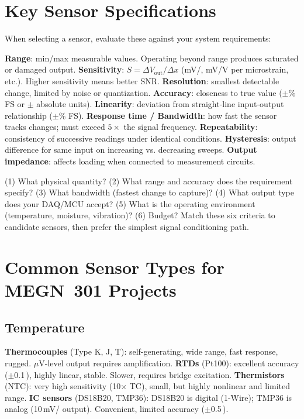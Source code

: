 \section{Key Sensor Specifications}
When selecting a sensor, evaluate these against your system requirements:

\textbf{Range}: min/max measurable values. Operating beyond range produces saturated or damaged output. \textbf{Sensitivity}: $S = \Delta V_{\text{out}}/\Delta x$ (mV/\degC{}, mV/V per microstrain, etc.). Higher sensitivity means better SNR. \textbf{Resolution}: smallest detectable change, limited by noise or quantization. \textbf{Accuracy}: closeness to true value ($\pm$\% FS or $\pm$ absolute units). \textbf{Linearity}: deviation from straight-line input-output relationship ($\pm$\% FS). \textbf{Response time / Bandwidth}: how fast the sensor tracks changes; must exceed $5\times$ the signal frequency. \textbf{Repeatability}: consistency of successive readings under identical conditions. \textbf{Hysteresis}: output difference for same input on increasing vs. decreasing sweeps. \textbf{Output impedance}: affects loading when connected to measurement circuits.

\begin{keyconceptbox}
(1) What physical quantity? (2) What range and accuracy does the requirement specify? (3) What bandwidth (fastest change to capture)? (4) What output type does your DAQ/MCU accept? (5) What is the operating environment (temperature, moisture, vibration)? (6) Budget? Match these six criteria to candidate sensors, then prefer the simplest signal conditioning path.
\end{keyconceptbox}

\section{Common Sensor Types for MEGN~301 Projects}

\subsection{Temperature}
\textbf{Thermocouples} (Type K, J, T): self-generating, wide range, fast response, rugged. $\mu$V-level output requires amplification. \textbf{RTDs} (Pt100): excellent accuracy ($\pm$0.1\,\degC{}), highly linear, stable. Slower, requires bridge excitation. \textbf{Thermistors} (NTC): very high sensitivity (10$\times$ TC), small, but highly nonlinear and limited range. \textbf{IC sensors} (DS18B20, TMP36): DS18B20 is digital (1-Wire); TMP36 is analog (10\,mV/\degC{} output). Convenient, limited accuracy ($\pm$0.5\,\degC{}).

